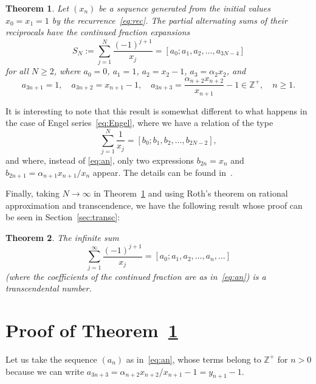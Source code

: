 \documentclass[11pt, a4paper]{amsart}
\newcommand{\Zp}{\mathbb{Z}^{+}}
\theoremstyle{plain}
\newtheorem{thm}{Theorem}
\theoremstyle{remark}
\begin{document}
\begin{thm}
\label{th:main}
Let $(x_n)$ be a sequence generated from the initial values $x_0 = x_1 = 1$ by the recurrence~\eqref{eq:rec}. The partial alternating sums of their reciprocals have the continued fraction expansions
\begin{equation}
\label{eq:SN}
  S_N := \sum_{j=1}^N \frac{(-1)^{j+1}}{x_j} 
  = [a_0;a_1,a_2,\dots,a_{3N-4}] 
\end{equation}
for all $N \ge 2$, where $a_0=0$, $a_1=1$, $a_2=x_2-1$, $a_3 = \alpha_2x_2$, and
\begin{equation}
\label{eq:an}
  a_{3n+1} = 1, \quad
  a_{3n+2} = x_{n+1}-1, \quad
  a_{3n+3} = \frac{\alpha_{n+2}x_{n+2}}{x_{n+1}} - 1 \in \Zp,
  \quad n \ge 1.
\end{equation}
\end{thm}

It is interesting to note that this result is somewhat different to what happens in the case of Engel series~\eqref{eq:Engel}, where we have a relation of the type
\[
  \sum_{j=1}^N \frac{1}{x_j} 
  = [b_0;b_1,b_2,\dots,b_{2N-2}],
\]
and where, instead of \eqref{eq:an}, only two expressions $b_{2n} = x_n$ and $b_{2n+1} = \alpha_{n+1}x_{n+1}/x_n$ appear. The details can be found in~\cite{Hone1}.

Finally, taking $N \to \infty$ in Theorem~\ref{th:main} and using Roth's theorem on rational approximation and transcendence, we have the following result whose proof can be seen in Section~\ref{sec:transc}:

\begin{thm}
\label{th:transc}
The infinite sum 
\begin{equation}
\label{eq:Sinfty}
  \sum_{j=1}^\infty \frac{(-1)^{j+1}}{x_j} 
  = [a_0;a_1,a_2,\dots,a_{n},\dots]
\end{equation}
(where the coefficients of the continued fraction are as in~\eqref{eq:an})
is a transcendental number.
\end{thm}

\section{Proof of Theorem~\ref{th:main}}
\label{sec:proof}

Let us take the sequence $(a_n)$ as in~\eqref{eq:an}, whose terms belong to $\Zp$ for $n>0$
because we can write $a_{3n+3} = \alpha_{n+2}x_{n+2}/x_{n+1}-1 = y_{n+1}-1$.
\end{document}
